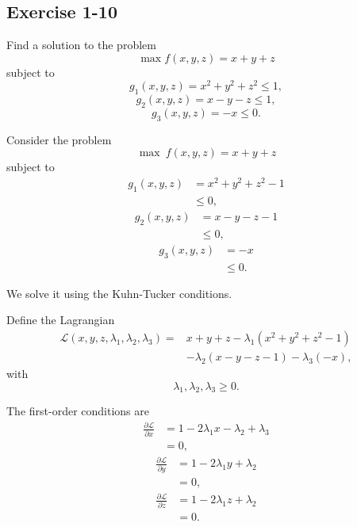 \vspace{30pt}
\begin{tcolorbox}[breakable]

\subsection*{Exercise 1-10}

Find a solution to the problem
\[
\max f(x,y,z)=x+y+z
\]
subject to
\[
g_1(x,y,z)=x^2+y^2+z^2 \le 1,
\]
\[
g_2(x,y,z)=x-y-z \le 1,
\]
\[
g_3(x,y,z)=-x \le 0.
\]

\end{tcolorbox}


Consider the problem
\[
\max \ f(x,y,z)=x+y+z
\]
subject to
\[\begin{aligned}
g_1(x,y,z)
&=x^2+y^2+z^2-1\\
&\le 0,
\end{aligned}
\]
\[
\begin{aligned}
g_2(x,y,z)
&=x-y-z-1\\
&\le 0,
\end{aligned}
\]
\[
\begin{aligned}
g_3(x,y,z)
&=-x\\
&\le 0.
\end{aligned}
\]

We solve it using the Kuhn-Tucker conditions.

Define the Lagrangian
\[
\begin{aligned}
\mathcal{L}(x,y,z,\lambda_1,\lambda_2,\lambda_3)
=
&x+y+z
-\lambda_1(x^2+y^2+z^2-1)\\
&-\lambda_2(x-y-z-1)
-\lambda_3(-x),
\end{aligned}
\]
with
\[
\lambda_1,\lambda_2,\lambda_3\ge 0.
\]

The first-order conditions are
\[
\begin{aligned}
\frac{\partial \mathcal{L}}{\partial x}
&=1-2\lambda_1 x-\lambda_2+\lambda_3\\
&=0,
\end{aligned}
 \tag{1}
\]
\[
\begin{aligned}
\frac{\partial \mathcal{L}}{\partial y}
&=
1-2\lambda_1 y+\lambda_2\\
&=0, 
\end{aligned}
\tag{2}
\]
\[
\begin{aligned}
\frac{\partial \mathcal{L}}{\partial z}
&=
1-2\lambda_1 z+\lambda_2\\
&=0. 
\end{aligned}
\tag{3}
\]

